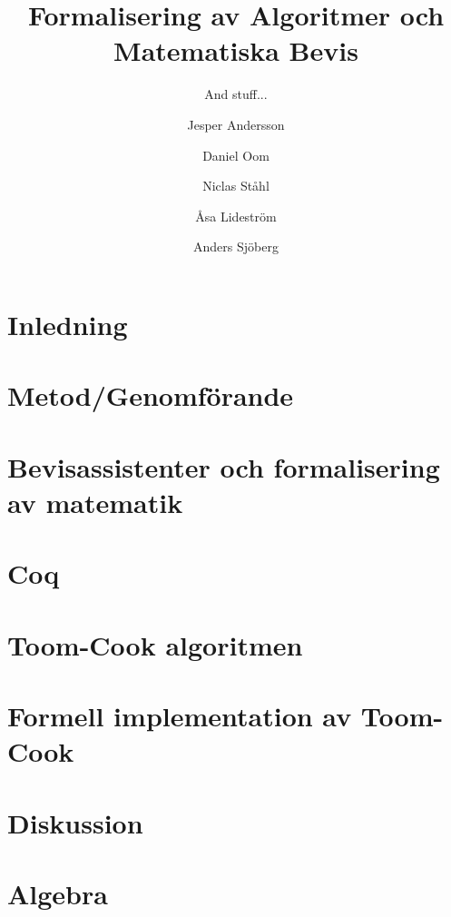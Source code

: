 \documentclass[bachelors,a4paper,gu]{chalmers-thesis}
\title{Formalisering av Algoritmer och Matematiska Bevis}
\subtitle{And stuff...}
\author{Jesper Andersson\and Daniel Oom\and Niclas Ståhl\and Åsa Lideström\and Anders Sjöberg}
\begin{document}
\maketitle

\chapter{Inledning}


\newpage
\chapter{Metod/Genomförande}


\newpage
\chapter{Bevisassistenter och formalisering av matematik}


\newpage
\chapter{Coq}




\newpage
\chapter{Toom-Cook algoritmen}






\newpage
\chapter{Formell implementation av Toom-Cook}



\newpage
\chapter{Diskussion}






\newpage
\nocite{*}
\printbibliography

\appendix
\newpage
\chapter{Algebra}

\end{document}
